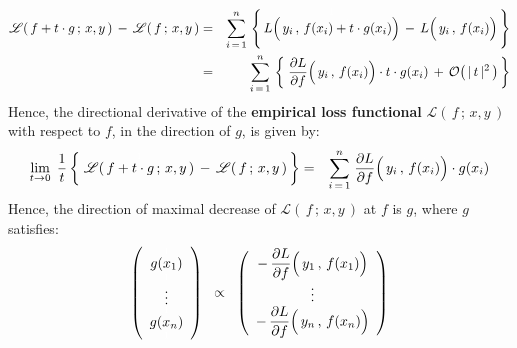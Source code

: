 \begin{eqnarray*}
\mathscr{L}(\,f + t \cdot g\,;\,x,y\,)
\,-\,
\mathscr{L}(\,f \,;\,x,y\,)
& = &
	\overset{n}{\underset{i\,=\,1}{\sum}}\,
	\left\{\,
		\overset{{\color{white}1}}{L\!\left(\,y_{i}\,,\,\overset{{\color{white}.}}{f(x_{i}) + t \cdot g(x_{i})}\right)}
		\, - \,
		L\!\left(\,y_{i}\,,\,\overset{{\color{white}.}}{f(x_{i})}\right)
		\,\right\}
\\
& = &
	\overset{n}{\underset{i\,=\,1}{\sum}}\,
	\left\{\;
		\dfrac{\partial L}{\partial f}\!\left(\,y_{i}\,,\,\overset{{\color{white}.}}{f(x_{i})}\right) \cdot t \cdot g(x_{i})
		\, + \,
		\mathcal{O}\!\left(\,\vert\,t\,\vert^{2}\,\right)
		\,\right\}
\end{eqnarray*}
Hence, the directional derivative of the \textbf{empirical loss functional} $\mathscr{L}(\,f\,;\,x,y\,)$
with respect to $f$, in the direction of $g$, is given by:
\begin{eqnarray*}
\underset{t \rightarrow 0}{\lim}\;\,
\dfrac{1}{t}
\left\{\;
	\overset{{\color{white}1}}{\mathscr{L}(\,f + t \cdot g\,;\,x,y\,)}
	\,-\,
	\mathscr{L}(\,f \,;\,x,y\,)
	\,\right\}
& = &
	\overset{n}{\underset{i\,=\,1}{\sum}}\;
	\dfrac{\partial L}{\partial f}\!\left(\,y_{i}\,,\,\overset{{\color{white}.}}{f(x_{i})}\right) \cdot g(x_{i})
\end{eqnarray*}
Hence, the direction of maximal decrease of $\mathscr{L}(\,f\,;\,x,y\,)$ at $f$ is $g$, where $g$ satisfies:
\begin{equation*}
\left(%
\begin{array}{c}
	\overset{{\color{white}1}}{g(x_{1})}
	\\
	\underset{{\color{white}1}}{\overset{{\color{white}1}}{\vdots}}
	\\
	\underset{{\color{white}1}}{g(x_{n})}
	\end{array}\right)
\;\; \propto \;\;
	\left(\begin{array}{c}
		-\, \dfrac{\partial L}{\partial f}\!\left(\,y_{1}\,,\,\overset{{\color{white}.}}{f(x_{1})}\right)
		\\
		\vdots
		\\
		-\, \dfrac{\partial L}{\partial f}\!\left(\,y_{n}\,,\,\overset{{\color{white}.}}{f(x_{n})}\right)
		\end{array}\right)
\end{equation*}

